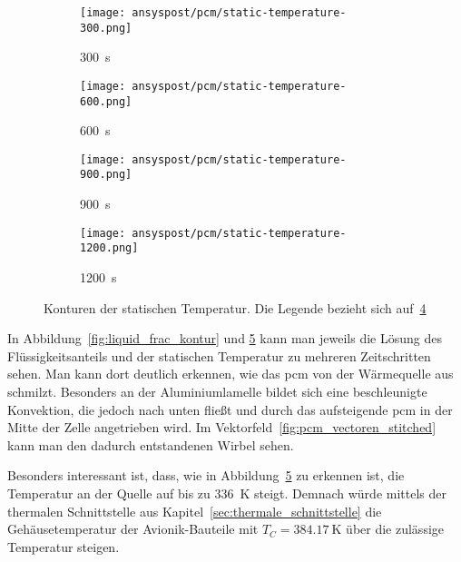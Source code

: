 \begin{figure}
\begin{minipage}[t]{0.485\textwidth}
\begin{subfigure}[t]{0.16\textwidth}
        \end{subfigure}%
        \hspace{2mm}%
        \begin{subfigure}[t]{0.2\textwidth}
            \centering
            \texttt{[image: ansyspost/pcm/static-temperature-300.png]}
            \caption{\SI{300}{\second}}\label{fig:temperatur_300}
        \end{subfigure}%
        \begin{subfigure}[t]{0.2\textwidth}
            \centering
            \texttt{[image: ansyspost/pcm/static-temperature-600.png]}
            \caption{\SI{600}{\second}}\label{fig:temperatur_600}
        \end{subfigure}%
        \begin{subfigure}[t]{0.2\textwidth}
            \centering
            \texttt{[image: ansyspost/pcm/static-temperature-900.png]}
            \caption{\SI{900}{\second}}\label{fig:temperatur_900}
        \end{subfigure}%
        \begin{subfigure}[t]{0.2\textwidth}
            \centering
            \texttt{[image: ansyspost/pcm/static-temperature-1200.png]}
            \caption{\SI{1200}{\second}}\label{fig:temperatur_1200}
        \end{subfigure}
        \caption{Konturen der statischen Temperatur. Die Legende bezieht sich auf~\ref{fig:temperatur_1200}}
        \label{fig:static_temperature_kontur}
    \end{minipage}

\end{figure}

In Abbildung~\ref{fig:liquid_frac_kontur} und \ref{fig:static_temperature_kontur} kann man jeweils die Lösung des Flüssigkeitsanteils
und der statischen Temperatur zu mehreren Zeitschritten sehen. Man kann dort deutlich erkennen, wie das \ac{pcm} von der Wärmequelle aus
schmilzt. Besonders an der Aluminiumlamelle bildet sich eine beschleunigte Konvektion, die jedoch nach unten fließt und durch das aufsteigende
\ac{pcm} in der Mitte der Zelle angetrieben wird. Im Vektorfeld~\ref{fig:pcm_vectoren_stitched} kann man den dadurch entstandenen Wirbel sehen.

Besonders interessant ist, dass, wie in Abbildung~\ref{fig:static_temperature_kontur} zu erkennen ist, die Temperatur an der Quelle auf bis zu \SI{336}{\kelvin}
steigt. Demnach würde mittels der thermalen Schnittstelle aus Kapitel~\ref{sec:thermale_schnittstelle} die Gehäusetemperatur der Avionik-Bauteile mit
$T_C = \SI{384,17}{\kelvin}$ über die zulässige Temperatur steigen.

